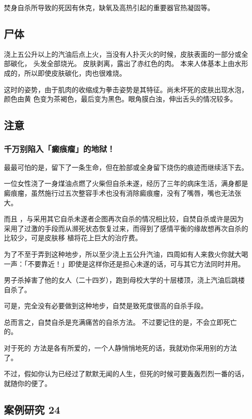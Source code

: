 \documentclass[UTF8]{ctexart}
\begin{document}
焚身自杀所导致的死因有休克，缺氧及高热引起的重要器官热凝固等。


\subsection{尸体}

浇上五公升以上的汽油后点上火，当没有人扑灭火的时候，皮肤表面的一部分或全部碳化，
头发全部烧光。
皮肤剥离，露出了赤红色的肉。
本来人体基本上由水形成的，所以即使皮肤碳化，肉也很难烧。

这时的姿势，由于肌肉的收缩成为拳击姿势是其特征。尚未坏死的皮肤出现水泡，颜色由黄
色变为茶褐色，最后变为黑色。眼角膜白浊，伸出舌头的情况较多。


\subsection{注意}

\subsubsection*{千万别陷入「癜痕瘤」的地狱！}

最最可怕的是，留下了一条生命，但在脸部或全身留下烧伤的痕迹而继续活下去。

一位女性浇了一身煤油点燃了火柴但自杀未遂，经历了三年的病床生活，满身都是癜痕瘤，虽然施行过五次整容手术也没有消除癜痕瘤，没有了嘴唇，嘴也无法张大。

而且 ，与采用其它自杀未遂者企图再次自杀的情况相比较，自焚自杀或许是因为采用了过激的手段而从濒死状态恢复过来，而得到了感情平衡的缘故想再次自杀的比较少，可是皮肤移 植将花上巨大的治疗费。

为了不至于弄到这种地步，所以至少浇上五公升汽油，四周如有人来救火你就大喝一声：「不要靠近！」即使是这样你还是担心未遂的话，可与其它方法同时并用。

男子杀掉害了他的女人（二十四岁），跑到母校大学的十层楼顶，浇上汽油后跳楼自杀了。

可是，完全没有必要做到这种地步，自焚是致死度很高的自杀手段。

总而言之，自焚自杀是充满痛苦的自杀方法。
不过要记住的是，不会立即死亡的。

对于死的 方法是各有所爱的，一个人静悄悄地死的话，我就劝你采用别的方法了。

不过，假如你认为已经过了默默无闻的人生，但死的时候可要轰轰烈烈一番的话，就随你的便了。


\subsection{案例研究 24}
\end{document}
